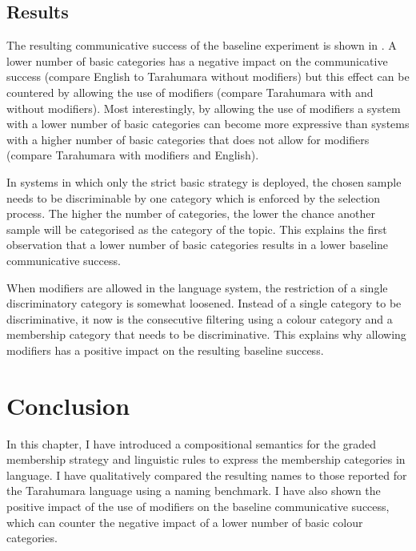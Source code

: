 \subsection{Results}
\label{s:gms-baseline-results}

The resulting communicative success of the baseline experiment is
shown in . A lower number of basic
categories has a negative impact on the communicative success (compare
English to Tarahumara without modifiers) but this effect can be
countered by allowing the use of modifiers (compare Tarahumara with
and without modifiers). Most interestingly, by allowing the use of
modifiers a system with a lower number of basic categories can become
more expressive than systems with a higher number of basic categories
that does not allow for modifiers (compare Tarahumara with modifiers
and English).

In systems in which only the strict basic strategy is deployed, the
chosen sample needs to be discriminable by one category which is
enforced by the selection process. The higher the number of
categories, the lower the chance another sample will be categorised as
the category of the topic. This explains the first observation that a
lower number of basic categories results in a lower baseline
communicative success.

When modifiers are allowed in the language system, the restriction of
a single discriminatory category is somewhat loosened. Instead of a
single category to be discriminative, it now is the consecutive
filtering using a colour category and a membership category that needs
to be discriminative. This explains why allowing modifiers has a
positive impact on the resulting baseline success.


\section{Conclusion}

In this chapter, I have introduced a compositional semantics for the
graded membership strategy and linguistic rules to express the
membership categories in language. I have qualitatively compared the
resulting names to those reported for the Tarahumara language using a
naming benchmark. I have also shown the positive impact of the use of
modifiers on the baseline communicative success, which can counter the
negative impact of a lower number of basic colour categories.